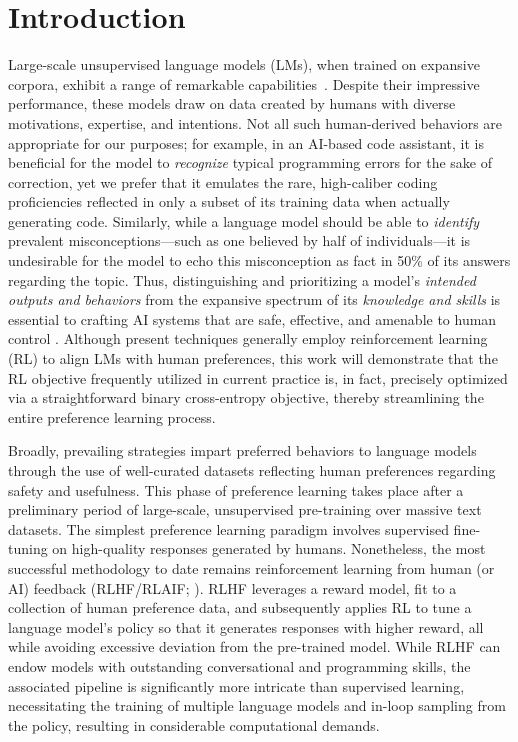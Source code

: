 \section{Introduction}
Large-scale unsupervised language models (LMs), when trained on expansive corpora, exhibit a range of remarkable capabilities~\citep{chowdhery2022palm, brown2020language, touvron2023llama,bubeck2023sparks}. Despite their impressive performance, these models draw on data created by humans with diverse motivations, expertise, and intentions. Not all such human-derived behaviors are appropriate for our purposes; for example, in an AI-based code assistant, it is beneficial for the model to \textit{recognize} typical programming errors for the sake of correction, yet we prefer that it emulates the rare, high-caliber coding proficiencies reflected in only a subset of its training data when actually generating code. Similarly, while a language model should be able to \textit{identify} prevalent misconceptions—such as one believed by half of individuals—it is undesirable for the model to echo this misconception as fact in 50\% of its answers regarding the topic. Thus, distinguishing and prioritizing a model’s \emph{intended outputs and behaviors} from the expansive spectrum of its \textit{knowledge and skills} is essential to crafting AI systems that are safe, effective, and amenable to human control \citep{ouyang2022training}. Although present techniques generally employ reinforcement learning (RL) to align LMs with human preferences, this work will demonstrate that the RL objective frequently utilized in current practice is, in fact, precisely optimized via a straightforward binary cross-entropy objective, thereby streamlining the entire preference learning process.

Broadly, prevailing strategies impart preferred behaviors to language models through the use of well-curated datasets reflecting human preferences regarding safety and usefulness. This phase of preference learning takes place after a preliminary period of large-scale, unsupervised pre-training over massive text datasets. The simplest preference learning paradigm involves supervised fine-tuning on high-quality responses generated by humans. Nonetheless, the most successful methodology to date remains reinforcement learning from human (or AI) feedback (RLHF/RLAIF; \citep{christiano2017deep,bai2022constitutional}). RLHF leverages a reward model, fit to a collection of human preference data, and subsequently applies RL to tune a language model’s policy so that it generates responses with higher reward, all while avoiding excessive deviation from the pre-trained model. While RLHF can endow models with outstanding conversational and programming skills, the associated pipeline is significantly more intricate than supervised learning, necessitating the training of multiple language models and in-loop sampling from the policy, resulting in considerable computational demands.

